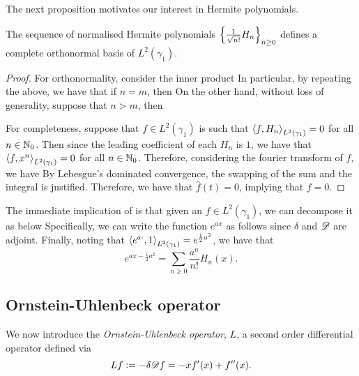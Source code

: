 \documentclass[../main.tex]{subfiles}
\begin{document}
The next proposition motivates our interest in Hermite polynomials.
\begin{proposition}
\label{prop:Hermite_basis}
The sequence of normalised Hermite polynomials $\cbr{\frac{1}{\sqrt{n!}}H_n}_{n\geq0}$ defines a complete orthonormal basis of $L^2(\gamma_1)$.
\end{proposition}
\begin{proof}
For orthonormality, consider the inner product  In particular, by repeating the above, we have that if $n=m$, then  On the other hand, without loss of generality, suppose that $n>m$, then 

For completeness, suppose that $f\in L^2(\gamma_1)$ is such that $\left\langle f,H_n \right\rangle_{L^2(\gamma_1)} = 0$ for all $n\in \operatorname{\mathbb{N}}_0$. Then since the leading coefficient of each $H_n$ is $1$, we have that $\left\langle f,x^n \right\rangle_{L^2(\gamma_1)} = 0$ for all $n\in\operatorname{\mathbb{N}}_0$. Therefore, considering the fourier transform of $f$, we have  By Lebesgue's dominated convergence, the swapping of the sum and the integral is justified. Therefore, we have that $\hat f(t) = 0$, implying that $f = 0$.
\end{proof}

The immediate implication of  is that given an $f\in L^2(\gamma_1)$, we can decompose it as below  Specifically, we can write the function $e^{ax}$ as follows  since $\delta$ and $\mathscr{D}$ are adjoint. Finally, noting that $\left\langle e^{a\cdot},1 \right\rangle_{L^2(\gamma_1)} = e^{\frac12a^2}$, we have that 
\begin{equation}
    \label{eq:1d_exp_decomposition}
    e^{ax - \frac12a^2} = \sum_{n\geq0}\frac{a^n}{n!}H_n(x).
\end{equation}

\subsection{Ornstein-Uhlenbeck operator}
We now introduce the \emph{Ornstein-Uhlenbeck operator}, $L$, a second order differential operator defined via 
\begin{equation}
    \label{eq:1d_OU_operator}
    Lf := -\delta\mathscr{D} f = -xf'(x) + f''(x).
\end{equation}
\end{document}
